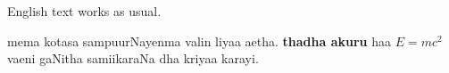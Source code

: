 \documentclass[11pt]{article}           %
\title{\singlish{magee paLamu sixhala lipiya}}
\author{\singlish{kathR naamaya}}
\date{}
\begin{document}
\maketitle

\section{}
 English text works as usual.

\begin{singlishtext}
mema kotasa sampuurNayenma  valin liyaa aetha.
\textbf{thadha akuru} haa $E = mc^2$ vaeni gaNitha samiikaraNa dha kriyaa karayi.
\end{singlishtext}

\section{}
\silipsum[1-2]
\end{document}
